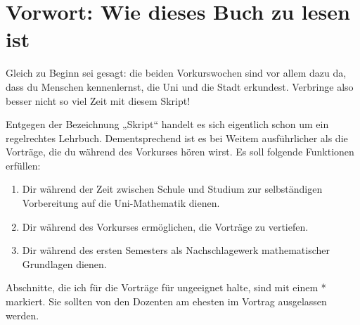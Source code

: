

\chapter{Vorwort: Wie dieses Buch zu lesen ist}

Gleich zu Beginn sei gesagt: die beiden Vorkurswochen sind vor allem dazu da, dass du Menschen kennenlernst, die Uni und die Stadt erkundest. Verbringe also besser nicht so viel Zeit mit diesem Skript!

Entgegen der Bezeichnung „Skript“ handelt es sich eigentlich schon um ein regelrechtes Lehrbuch. Dementsprechend ist es bei Weitem ausführlicher als die Vorträge, die du während des Vorkurses hören wirst. Es soll folgende Funktionen erfüllen:
\begin{enumerate}[1.]
    \item Dir während der Zeit zwischen Schule und Studium zur selbständigen Vorbereitung auf die Uni-Mathematik dienen.
    \item Dir während des Vorkurses ermöglichen, die Vorträge zu vertiefen.
    \item Dir während des ersten Semesters als Nachschlagewerk mathematischer Grundlagen dienen.
\end{enumerate}
Abschnitte, die ich für die Vorträge für ungeeignet halte, sind mit einem * markiert. Sie sollten von den Dozenten am ehesten im Vortrag ausgelassen werden.

